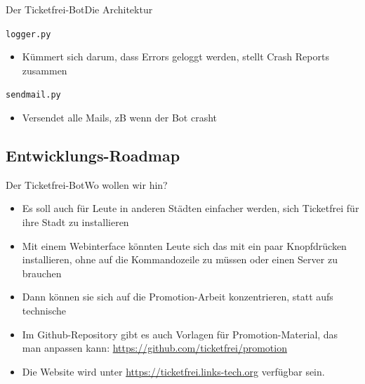 \documentclass[10pt]{beamer}
\begin{document}
{\begin{frame}{Der Ticketfrei-Bot}{Die Architektur}
\begin{block}{{\tt logger.py}}
  \begin{itemize}
    \item Kümmert sich darum, dass Errors geloggt werden, stellt Crash Reports zusammen
  \end{itemize}
\end{block}

\begin{block}{{\tt sendmail.py}}
  \begin{itemize}
    \item Versendet alle Mails, zB wenn der Bot crasht
  \end{itemize}
\end{block}

\end{frame}

\subsection{Entwicklungs-Roadmap}
\begin{frame}{Der Ticketfrei-Bot}{Wo wollen wir hin?}

\begin{itemize}
  \item<1-> Es soll auch für Leute in anderen Städten einfacher werden, sich Ticketfrei für ihre Stadt zu installieren
  \item<1-> Mit einem Webinterface könnten Leute sich das mit ein paar Knopfdrücken installieren, ohne auf die Kommandozeile zu müssen oder einen Server zu brauchen
  \item<2-> Dann können sie sich auf die Promotion-Arbeit konzentrieren, statt aufs technische
  \item<2-> Im Github-Repository gibt es auch Vorlagen für Promotion-Material, das man anpassen kann: \url{https://github.com/ticketfrei/promotion}
  \item<2-> Die Website wird unter \url{https://ticketfrei.links-tech.org} verfügbar sein.
\end{itemize}

\end{frame}

}
\end{document}

